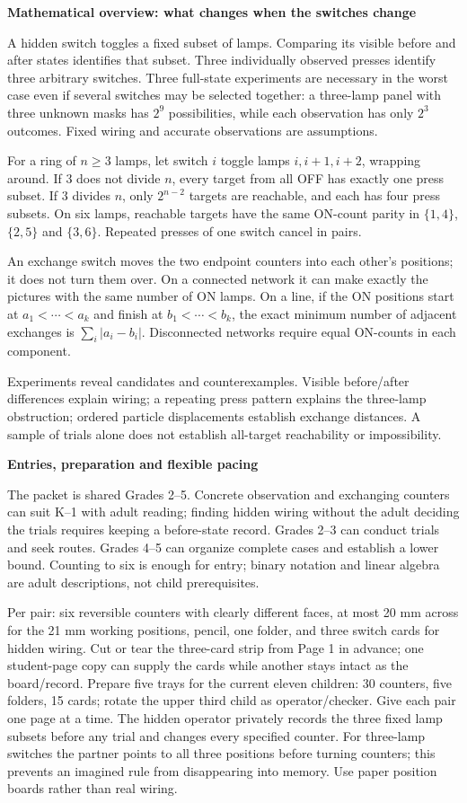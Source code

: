 \documentclass[11pt]{article}
\newcommand\lead[1]{\textbf{#1}\par}
\begin{document}
\lead{Mathematical overview: what changes when the switches change}
A hidden switch toggles a fixed subset of lamps. Comparing its visible before and after states identifies that subset. Three individually observed presses identify three arbitrary switches. Three full-state experiments are necessary in the worst case even if several switches may be selected together: a three-lamp panel with three unknown masks has $2^9$ possibilities, while each observation has only $2^3$ outcomes. Fixed wiring and accurate observations are assumptions.

For a ring of $n\ge 3$ lamps, let switch $i$ toggle lamps $i,i+1,i+2$, wrapping around. If $3$ does not divide $n$, every target from all OFF has exactly one press subset. If $3$ divides $n$, only $2^{n-2}$ targets are reachable, and each has four press subsets. On six lamps, reachable targets have the same ON-count parity in $\{1,4\}$, $\{2,5\}$ and $\{3,6\}$. Repeated presses of one switch cancel in pairs.

An exchange switch moves the two endpoint counters into each other's positions; it does not turn them over. On a connected network it can make exactly the pictures with the same number of ON lamps. On a line, if the ON positions start at $a_1<\cdots<a_k$ and finish at $b_1<\cdots<b_k$, the exact minimum number of adjacent exchanges is $\sum_i|a_i-b_i|$. Disconnected networks require equal ON-counts in each component.

Experiments reveal candidates and counterexamples. Visible before/after differences explain wiring; a repeating press pattern explains the three-lamp obstruction; ordered particle displacements establish exchange distances. A sample of trials alone does not establish all-target reachability or impossibility.

\lead{Entries, preparation and flexible pacing}
The packet is shared Grades 2--5. Concrete observation and exchanging counters can suit K--1 with adult reading; finding hidden wiring without the adult deciding the trials requires keeping a before-state record. Grades 2--3 can conduct trials and seek routes. Grades 4--5 can organize complete cases and establish a lower bound. Counting to six is enough for entry; binary notation and linear algebra are adult descriptions, not child prerequisites.

Per pair: six reversible counters with clearly different faces, at most 20 mm across for the 21 mm working positions, pencil, one folder, and three switch cards for hidden wiring. Cut or tear the three-card strip from Page 1 in advance; one student-page copy can supply the cards while another stays intact as the board/record. Prepare five trays for the current eleven children: 30 counters, five folders, 15 cards; rotate the upper third child as operator/checker. Give each pair one page at a time. The hidden operator privately records the three fixed lamp subsets before any trial and changes every specified counter. For three-lamp switches the partner points to all three positions before turning counters; this prevents an imagined rule from disappearing into memory. Use paper position boards rather than real wiring.
\end{document}
